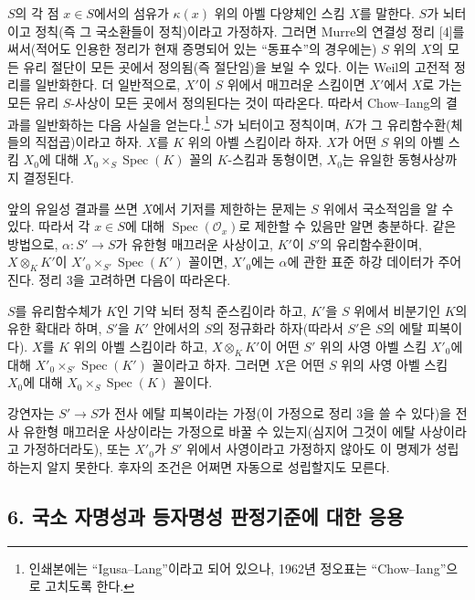 $S$의 각 점 $x\in S$에서의 섬유가 $\kappa(x)$ 위의 아벨 다양체인
스킴 $X$를 말한다. $S$가 뇌터이고 정칙(즉 그 국소환들이 정칙)이라고
가정하자. 그러면 Murre의 연결성 정리 [4]를 써서(적어도 인용한 정리가
현재 증명되어 있는 ``동표수''의 경우에는) $S$ 위의 $X$의 모든 유리
절단이 모든 곳에서 정의됨(즉 절단임)을 보일 수 있다. 이는 Weil의
고전적 정리를 일반화한다. 더 일반적으로, $X'$이 $S$ 위에서 매끄러운
스킴이면 $X'$에서 $X$로 가는 모든 유리 $S$-사상이 모든 곳에서
정의된다는 것이 따라온다. 따라서 Chow--Iang의 결과를 일반화하는 다음
사실을 얻는다.\footnote{인쇄본에는 ``Igusa--Lang''이라고 되어 있으나,
1962년 정오표는 ``Chow--Iang''으로 고치도록 한다.} $S$가 뇌터이고
정칙이며, $K$가 그 유리함수환(체들의 직접곱)이라고 하자. $X$를 $K$
위의 아벨 스킴이라 하자. $X$가 어떤 $S$ 위의 아벨 스킴 $X_0$에 대해
$X_0\times_S\operatorname{Spec}(K)$ 꼴의 $K$-스킴과 동형이면, $X_0$는
유일한 동형사상까지 결정된다.

앞의 유일성 결과를 쓰면 $X$에서 기저를 제한하는 문제는 $S$ 위에서
국소적임을 알 수 있다. 따라서 각 $x\in S$에 대해
$\operatorname{Spec}(\mathcal O_x)$로 제한할 수 있음만 알면 충분하다.
같은 방법으로, $\alpha:S'\longrightarrow S$가 유한형 매끄러운 사상이고,
$K'$이 $S'$의 유리함수환이며, $X\otimes_KK'$이
$X'_0\times_{S'}\operatorname{Spec}(K')$ 꼴이면, $X'_0$에는
$\alpha$에 관한 표준 하강 데이터가 주어진다. 정리 3을 고려하면 다음이
따라온다.

 $S$를 유리함수체가 $K$인 기약 뇌터 정칙 준스킴이라
하고, $K'$을 $S$ 위에서 비분기인 $K$의 유한 확대라 하며, $S'$을
$K'$ 안에서의 $S$의 정규화라 하자(따라서 $S'$은 $S$의 에탈 피복이다).
$X$를 $K$ 위의 아벨 스킴이라 하고, $X\otimes_KK'$이 어떤 $S'$ 위의
사영 아벨 스킴 $X'_0$에 대해
$X'_0\times_{S'}\operatorname{Spec}(K')$ 꼴이라고 하자. 그러면 $X$은
어떤 $S$ 위의 사영 아벨 스킴 $X_0$에 대해
$X_0\times_S\operatorname{Spec}(K)$ 꼴이다.

 강연자는 $S'\longrightarrow S$가 전사 에탈 피복이라는
가정(이 가정으로 정리 3을 쓸 수 있다)을 전사 유한형 매끄러운 사상이라는
가정으로 바꿀 수 있는지(심지어 그것이 에탈 사상이라고 가정하더라도),
또는 $X'_0$가 $S'$ 위에서 사영이라고 가정하지 않아도 이 명제가
성립하는지 알지 못한다. 후자의 조건은 어쩌면 자동으로 성립할지도 모른다.

\subsection*{6. 국소 자명성과 등자명성 판정기준에 대한 응용}


